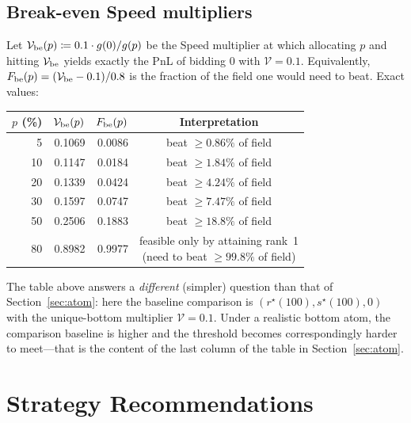 \documentclass[11pt,a4paper]{article}
\theoremstyle{definition}
\theoremstyle{remark}
\newcommand{\Sp}{\mathcal{V}}
\begin{document}
\subsection{Break-even Speed multipliers}

Let \(\Sp_{\rm be}(p)\coloneqq 0.1\cdot g(0)/g(p)\) be the Speed multiplier at
which allocating \(p\) and hitting \(\Sp_{\rm be}\) yields exactly the PnL of
bidding \(0\) with \(\Sp=0.1\). Equivalently, \(F_{\rm be}(p)=(\Sp_{\rm be}-0.1)/0.8\)
is the fraction of the field one would need to beat. Exact values:

\begin{center}
\renewcommand{\arraystretch}{1.10}
\begin{tabular}{r r r c}
\toprule
\(p\) (\%) & \(\Sp_{\rm be}(p)\) & \(F_{\rm be}(p)\) & Interpretation \\
\midrule
5  & 0.1069 & 0.0086 & beat \(\ge 0.86\%\) of field \\
10 & 0.1147 & 0.0184 & beat \(\ge 1.84\%\) of field \\
20 & 0.1339 & 0.0424 & beat \(\ge 4.24\%\) of field \\
30 & 0.1597 & 0.0747 & beat \(\ge 7.47\%\) of field \\
50 & 0.2506 & 0.1883 & beat \(\ge 18.8\%\) of field \\
80 & 0.8982 & 0.9977 & \parbox{5.7cm}{\raggedright feasible only by attaining rank~1\\ (need to beat \(\ge 99.8\%\) of field)} \\
\bottomrule
\end{tabular}
\end{center}

The table above answers a \emph{different} (simpler) question than that of
Section~\ref{sec:atom}: here the baseline comparison is
\((r^\star(100),s^\star(100),0)\) with the unique-bottom multiplier \(\Sp=0.1\).
Under a realistic bottom atom, the comparison baseline is higher and the
threshold becomes correspondingly harder to meet---that is the content of
the last column of the table in Section~\ref{sec:atom}.

\section{Strategy Recommendations}\label{sec:recs}
\end{document}
